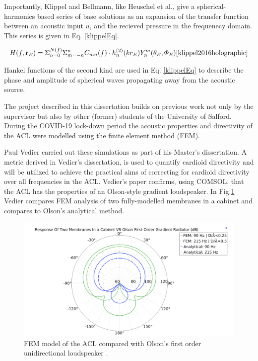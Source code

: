 \documentclass{report}
\newcommand{\matr}[1]{\mathbf{#1}} %
\begin{document}
        Importantly, Klippel and Bellmann, like Heuschel et al., give a spherical-harmonics based series of base solutions as an expansion of the transfer function between an acoustic input $u$, and the recieved pressure in the frequenecy domain.
        This series is given in Eq. \ref{klippelEq}.

        \begin{equation}
            H(f,\matr{r}_E) = \Sigma_{n=0}^{N(f)}\Sigma_{m=-n}^{n}C_{mn}(f) \cdot h_n^{(2)}(kr_E)Y_n^m(\theta_E,\varPhi_E)\cite{klippel2016holographic}
            \label{klippelEq}
        \end{equation}

        Hankel functions of the second kind are used in Eq. \ref{klippelEq} to describe the phase and amplitude of spherical waves propagating away from the acoustic source.
        
        The project described in this dissertation builds on previous work not only by the supervisor but also by other (former) students of the University of Salford.
        During the COVID-19 lock-down period the acoustic properties and directivity of the ACL were modelled using the finite element method (FEM).
        
        Paul Vedier carried out these simulations as part of his Master's dissertation.
        A metric derived in Vedier's dissertation, is used to quantify cardioid directivity and will be utilized to achieve the practical aims of correcting for cardioid directivity over all frequencies in the ACL.
        Vedier's paper confirms, using COMSOL, that the ACL has the properties of an Olson-style gradient loudspeaker.
        In Fig.\ref{vedierPolar} Vedier compares FEM analysis of two fully-modelled membranes in a cabinet and compares to Olson's analytical method.
        
        \begin{figure}[H]
            \centering
            \includegraphics[scale=0.4]{figs/vedierPolar.png}
            \caption{FEM model of the ACL compared with Olson's first order unidirectional loudspeaker \cite{vedier}.}
            \label{vedierPolar}
        \end{figure}
\end{document}
